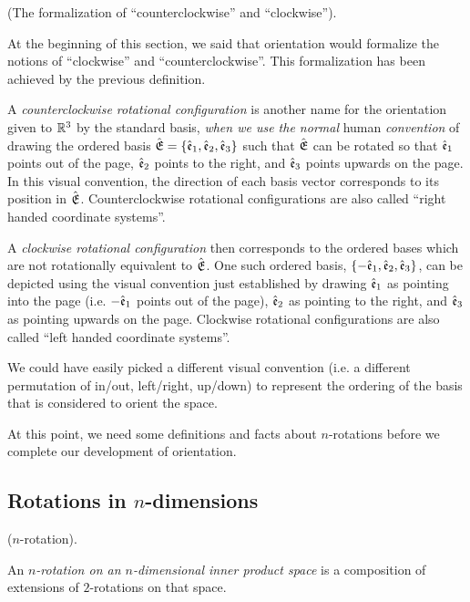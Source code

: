 \begin{remark}
\label{ch::exterior_pwrs::rmk::formalization_ccw_cw}
    (The formalization of ``counterclockwise'' and ``clockwise'').
    
    At the beginning of this section, we said that orientation would formalize the notions of ``clockwise'' and ``counterclockwise''. This formalization has been achieved by the previous definition.
    
    A \textit{counterclockwise rotational configuration} is another name for the orientation given to $\mathbb{R}^3$ by the standard basis, \textit{when we use the normal} human \textit{convention} of drawing the ordered basis ${\hat{\mathfrak{E}}} = \{\hat{\mathfrak{e}}_1, \hat{\mathfrak{e}}_2, \hat{\mathfrak{e}}_3\}$ such that ${\hat{\mathfrak{E}}}$ can be rotated so that $\hat{\mathfrak{e}}_1$ points out of the page, $\hat{\mathfrak{e}}_2$ points to the right, and $\hat{\mathfrak{e}}_3$ points upwards on the page. In this visual convention, the direction of each basis vector corresponds to its position in ${\hat{\mathfrak{E}}}$. Counterclockwise rotational configurations are also called ``right handed coordinate systems''.
    
    A \textit{clockwise rotational configuration} then corresponds to the ordered bases which are not rotationally equivalent to ${\hat{\mathfrak{E}}}$. One such ordered basis, $\{-\hat{\mathfrak{e}}_1, \hat{\mathfrak{e}}_2, \hat{\mathfrak{e}}_3\}$, can be depicted using the visual convention just established by drawing $\hat{\mathfrak{e}}_1$ as pointing into the page (i.e. $-\hat{\mathfrak{e}}_1$ points out of the page), $\hat{\mathfrak{e}}_2$ as pointing to the right, and $\hat{\mathfrak{e}}_3$ as pointing upwards on the page. Clockwise rotational configurations are also called ``left handed coordinate systems''.
    
    We could have easily picked a different visual convention (i.e. a different permutation of in/out, left/right, up/down) to represent the ordering of the basis that is considered to orient the space.
\end{remark}

At this point, we need some definitions and facts about $n$-rotations before we complete our development of orientation.

\subsection*{Rotations in $n$-dimensions}

\begin{defn}
\label{ch::exterior_pwrs::defn::n-rotation}
    ($n$-rotation).
    
    An \textit{$n$-rotation on an $n$-dimensional inner product space} is a composition of extensions of $2$-rotations on that space.
\end{defn}

